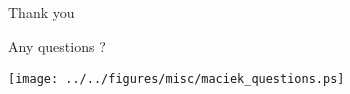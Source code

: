 \documentclass[compress,red]{beamer}
\begin{document}
\subsection{}
\begin{frame}{Thank you}

    \begin{center}
    Any questions ?
    \end{center}

    
    \begin{center}
    \texttt{[image: ../../figures/misc/maciek\_questions.ps]}
    \end{center}

\end{frame}
\end{document}

